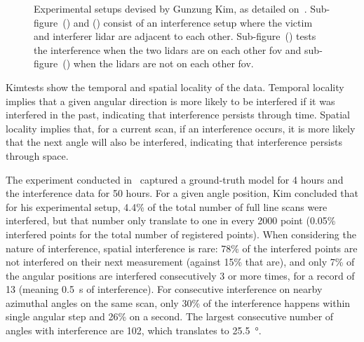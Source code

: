 \begin{figure}[!ht]
	\caption{Experimental setups devised by Gunzung Kim\etal, as detailed on~\cite{Kim2017}. Sub-figure~() and () consist of an interference setup where the victim and interferer \ac{lidar} are adjacent to each other. Sub-figure~() tests the interference when the two \acp{lidar} are on each other \ac{fov} and sub-figure~() when the \acp{lidar} are not on each other \ac{fov}.}
	\label{fig:kim-setups}
\end{figure}



Kim\etal tests show the temporal and spatial locality of the data. Temporal locality implies that a given angular direction is more likely to be interfered if it was interfered in the past, indicating that interference persists through time. Spatial locality implies that, for a current scan, if an interference occurs, it is more likely that the next angle will also be interfered, indicating that interference persists through space. 

The experiment conducted in~\cite{Kim2015a} captured a ground-truth model for 4 hours and the interference data for 50 hours. For a given angle position, Kim concluded that for his experimental setup, 4.4\% of the total number of full line scans were interfered, but that number only translate to one in every 2000 point (0.05\% interfered points for the total number of registered points). When considering the nature of interference, spatial interference is rare: 78\% of the interfered points are not interfered on their next measurement (against 15\% that are), and only 7\% of the angular positions are interfered consecutively 3 or more times, for a record of 13 (meaning \SI{0.5}{\second} of interference). For consecutive interference on nearby azimuthal angles on the same scan, only 30\% of the interference happens within single angular step and 26\% on a second. The largest consecutive number of angles with interference are 102, which translates to \SI{25.5}{\degree}.

